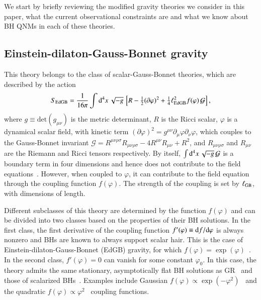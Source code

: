 \documentclass[twocolumn,
               prd,
               aps,
               superscriptaddress,
               tightenlines,
               nofootinbib,
               eqsecnum,
               amsfonts,
               amsmath,
               longbibliography]{revtex4-1}
\newcommand{\dd}{{\rm d}}
\newcommand{\dV}{{\rm d}^{4}x \, \sqrt{-g} \,}
\begin{document}
We start by briefly reviewing the modified gravity theories we consider in this
paper, what the current observational constraints are and what we know
about BH QNMs in each of these theories.

\subsection{Einstein-dilaton-Gauss-Bonnet gravity}
\label{sec:review_edgb}

This theory belongs to the class of scalar-Gauss-Bonnet theories, which are
described by the action
%
\begin{align} \label{eq:action_sgb}
    S_{\rm EdGB} = \frac{1}{16 \pi}
    \int \dV
    \left[
    R - \tfrac{1}{2}(\partial \varphi)^2
    + \tfrac{1}{4} \ell^{2}_{\rm EdGB} f(\varphi) \, \mathcal{G}
    \right],
    \nonumber \\
\end{align}
%
where $g \equiv \textrm{det}(g_{\mu \nu})$ is the metric determinant, $R$ is the Ricci
scalar, $\varphi$ is a dynamical scalar field, with kinetic term $(\partial \varphi)^2 = g^{\mu\nu} \partial_{\mu} \varphi \partial_{\nu} \varphi$,
which couples to the Gauss-Bonnet invariant
%
$\mathcal{G} =
R^{\mu\nu\rho\sigma}R_{\mu\nu\rho\sigma}
- 4 R^{\mu\nu}R_{\mu\nu}
+ R^2$,
%
and $R_{\mu\nu\rho\sigma}$ and $R_{\mu\nu}$ are the Riemann and Ricci tensors respectively.
%
By itself, $\int \dV \mathcal{G}$ is a boundary term in four dimensions
and hence does not contribute to the field equations~\cite{Myers:1987yn}.
%
However,  when coupled to $\varphi$, it can contribute to the field equation
through the coupling function $f(\varphi)$. The strength of the coupling is
set by $\ell_{\rm GB}$, with dimensions of length.

Different subclasses of this theory are determined by the function $f(\varphi)$
and can be divided into two classes based on the properties of their BH
solutions.
%
In the first class, the first derivative of the coupling function $f'(\varphi)
\equiv \dd f  / \dd \varphi$ is always nonzero and BHs are known to always
support scalar hair.
%
This is the case of Einstein-dilaton-Gauss-Bonnet (EdGB) gravity, for which
$f(\varphi) = \exp(\varphi)$~\cite{Kanti:1995vq}.
%
In the second class, $f'(\varphi) = 0$ can vanish for some constant $\varphi_0$.
%
In this case, the theory admits the same stationary, asymptotically flat BH
solutions as GR~\cite{Silva:2017uqg} and those of scalarized
BHs~\cite{Doneva:2017bvd,Silva:2017uqg,Macedo:2019sem,Dima:2020yac,Herdeiro:2020wei,Berti:2020kgk}.
%
Examples include Gaussian $f(\varphi) \propto \exp(-\varphi^2)$~\cite{Doneva:2017bvd} and
the quadratic $f(\varphi) \propto \varphi^2$~\cite{Silva:2017uqg} coupling functions.
\end{document}
